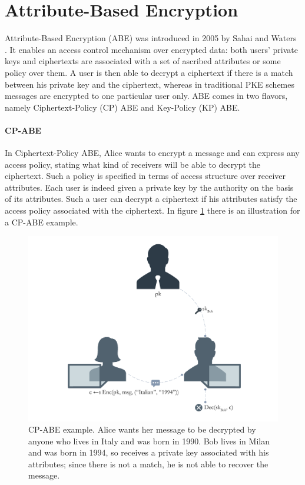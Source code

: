\section{Attribute-Based Encryption}\label{sec:abe}

Attribute-Based Encryption (ABE) was introduced in 2005 by Sahai and Waters \cite{Sahai}.
It enables an access control mechanism over encrypted data: both users’ private keys and ciphertexts are associated with a set of ascribed attributes or some policy over them.
A user is then able to decrypt a ciphertext if there is a match between his private key and the ciphertext, whereas in traditional PKE schemes messages are encrypted to one particular user only.
\newline\newline
ABE comes in two flavors, namely Ciphertext-Policy (CP) ABE and Key-Policy (KP) ABE.

\paragraph*{CP-ABE}
In Ciphertext-Policy ABE, Alice wants to encrypt a message and can express any access policy, stating what kind of receivers will be able to decrypt the ciphertext.
Such a policy is specified in terms of access structure over receiver attributes.
Each user is indeed given a private key by the authority on the basis of its attributes.
Such a user can decrypt a ciphertext if his attributes satisfy the access policy associated with the ciphertext.
In figure \ref{fig:cp_abe_example} there is an illustration for a CP-ABE example.
\begin{figure}[ht]
    \centering
    \includegraphics[width=\linewidth]{images/cp_abe.png}
    \caption{CP-ABE example. Alice wants her message to be decrypted by anyone who lives in Italy and was born in 1990. Bob lives in Milan and was born in 1994, so receives a private key associated with his attributes; since there is not a match, he is not able to recover the message.}
    \label{fig:cp_abe_example}
\end{figure}

